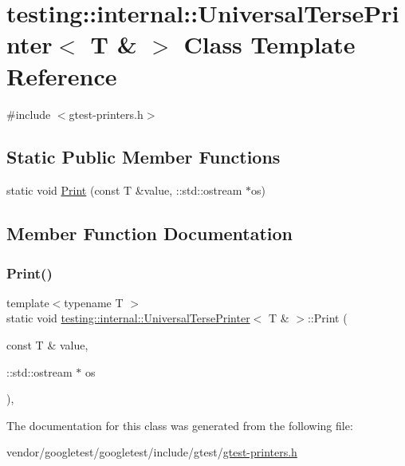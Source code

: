\hypertarget{classtesting_1_1internal_1_1_universal_terse_printer_3_01_t_01_6_01_4}{}\section{testing\+:\+:internal\+:\+:Universal\+Terse\+Printer$<$ T \& $>$ Class Template Reference}
\label{classtesting_1_1internal_1_1_universal_terse_printer_3_01_t_01_6_01_4}


{\ttfamily \#include $<$gtest-\/printers.\+h$>$}

\subsection*{Static Public Member Functions}
\begin{DoxyCompactItemize}
\item 
static void \hyperlink{classtesting_1_1internal_1_1_universal_terse_printer_3_01_t_01_6_01_4_a931f93cc52a3046706c87d0a90640483}{Print} (const T \&value, \+::std\+::ostream $\ast$os)
\end{DoxyCompactItemize}


\subsection{Member Function Documentation}
\mbox{\label{classtesting_1_1internal_1_1_universal_terse_printer_3_01_t_01_6_01_4_a931f93cc52a3046706c87d0a90640483}} 
\subsubsection{\texorpdfstring{Print()}{Print()}}
{\footnotesize\ttfamily template$<$typename T $>$ \\
static void \hyperlink{classtesting_1_1internal_1_1_universal_terse_printer}{testing\+::internal\+::\+Universal\+Terse\+Printer}$<$ T \& $>$\+::Print (\begin{DoxyParamCaption}\item[{const T \&}]{value,  }\item[{\+::std\+::ostream $\ast$}]{os }\end{DoxyParamCaption})\hspace{0.3cm}{\ttfamily [inline]}, {\ttfamily [static]}}



The documentation for this class was generated from the following file\+:\begin{DoxyCompactItemize}
\item 
vendor/googletest/googletest/include/gtest/\hyperlink{gtest-printers_8h}{gtest-\/printers.\+h}\end{DoxyCompactItemize}
